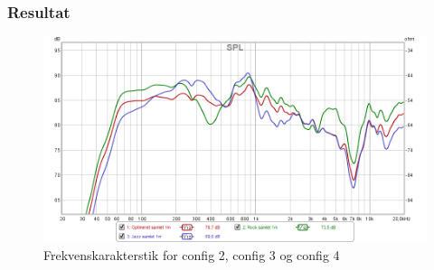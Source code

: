 \subsubsection{Resultat}

\begin{figure}[H]
	\center
	\includegraphics[width=1\textwidth]{figur/EQ-forskelle}
	\caption{Frekvenskarakterstik for config 2, config 3 og config 4}
	\label{fig:EQ-forskelle}
\end{figure}



